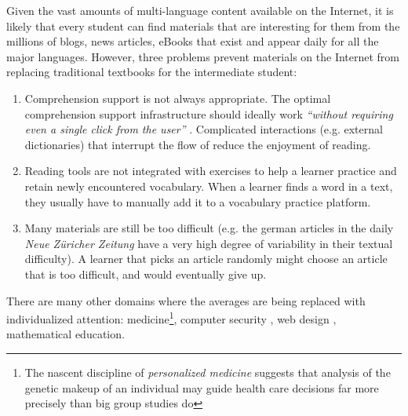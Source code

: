 Given the vast amounts of multi-language content available on the Internet, it is likely that every student can find materials that are interesting for them from the millions of blogs, news articles, eBooks that exist and appear daily for all the major languages. 
% 
% 
% 
% 
% 
% 
% 
However, three problems prevent materials on the Internet from replacing traditional textbooks for the intermediate student:

\begin{enumerate}
	

  \item Comprehension support is not always appropriate. The optimal comprehension support infrastructure should ideally work {\em ``without requiring even a single click from the user''} \cite{Proszeky02-Comprehension}. 
  Complicated interactions (e.g. external dictionaries) that interrupt the flow of reduce the enjoyment of reading.
  
  \item Reading tools are not integrated with exercises to help a learner practice and retain newly encountered vocabulary. When a learner finds a word in a text, they usually have to manually add it to a vocabulary practice platform. 

  \item Many materials are still be too difficult (e.g. the german articles in the  daily {\em Neue Z\"uricher Zeitung} have a very high degree of variability in their textual difficulty). A learner that picks an article randomly might choose an article that is too difficult, and would eventually give up. 

  
\end{enumerate}


There are many other domains where the averages are being replaced with individualized attention: medicine\footnote{The nascent discipline of {\em personalized medicine} suggests that analysis of the genetic makeup of an individual may guide health care decisions far more precisely than big group studies do}, computer security %
, web design\cite{Reinecke13-CulturalAdaptation} , mathematical education\cite{Polozov15-AdaptableMath}. 

